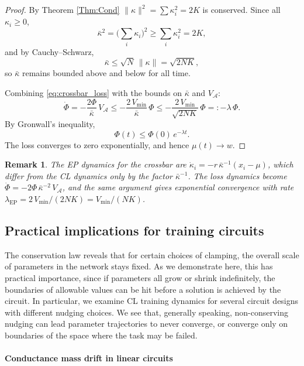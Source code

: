 \documentclass[final, 11pt, nonatbib]{elsarticle}
\theoremstyle{definition}
\theoremstyle{plain}
\newtheorem{remark}[definition]{Remark}
\numberwithin{equation}{section}
\begin{document}
\begin{proof}
By Theorem \ref{Thm:Cond} 
$\|\kappa\|^2 = \sum \kappa_i^2 = 2K$ is conserved.
Since all $\kappa_i \geq 0$,
\[
\bar{\kappa}^2 = \Big(\sum_i \kappa_i\Big)^2
\geq \sum_i \kappa_i^2 = 2K,
\]
and by Cauchy--Schwarz,
\[
\bar{\kappa} \leq \sqrt{N}\,\|\kappa\| = \sqrt{2NK},
\]
so $\bar{\kappa}$ remains bounded above and below for all time.

Combining \eqref{eq:crossbar_loss} with the bounds on $\bar{\kappa}$ and
$V_{\mathcal{A}}$:
\begin{equation}
\label{eq:Phi_dot_crossbar}
\dot{\Phi}
= -\dfrac{2\Phi}{\bar{\kappa}}\, V_{\mathcal{A}}
\leq -\dfrac{2\,V_{\min}}{\bar{\kappa}}\,\Phi
\leq -\dfrac{2\,V_{\min}}{\sqrt{2NK}}\,\Phi
=: -\lambda\,\Phi.
\end{equation}
By Gronwall's inequality,
\[
\Phi(t) \leq \Phi(0)\, e^{-\lambda t}.
\]
The loss converges to zero exponentially, and hence $\mu(t) \to w$.
\end{proof}

\begin{remark}
The EP dynamics for the crossbar are
$\dot{\kappa}_i = -r\,\bar{\kappa}^{-1}(x_i - \mu)$,
which differ from the CL dynamics only by the factor $\bar{\kappa}^{-1}$.
The loss dynamics become
$\dot{\Phi} = -2\Phi\,\bar{\kappa}^{-2}\,V_{\mathcal{A}}$,
and the same argument gives exponential convergence with rate
$\lambda_{\mathrm{EP}} = 2\,V_{\min}/(2NK) = V_{\min}/(NK)$.
\label{Rmk:EP_Crossbar}
\end{remark}



\subsection{Practical implications for training circuits}
\label{sec:practical_implications}

The conservation law reveals that for certain choices of clamping, the overall scale of parameters in the network stays fixed. As we demonstrate here, this has practical importance, since if parameters all grow or shrink indefinitely, the boundaries of allowable values can be hit before a solution is achieved by the circuit. In particular, we examine CL training dynamics for several circuit designs with different nudging choices. We see that, generally speaking, non-conserving nudging can lead parameter trajectories to never converge, or converge only on boundaries of the space where the task may be failed.

\paragraph{Conductance mass drift in linear circuits}
\end{document}
